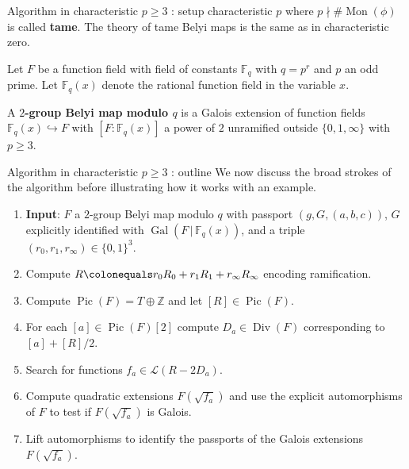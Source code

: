 \documentclass[xcolor=dvipsnames]{beamer}
\theoremstyle{plain}
\newcommand{\ZZ}{\mathbb Z}
\newcommand{\FF}{\mathbb{F}}
\DeclareMathOperator{\Div}{Div}
\DeclareMathOperator{\Pic}{Pic}
\DeclareMathOperator{\Mon}{Mon}
\DeclareMathOperator{\Gal}{Gal}
\begin{document}
{\begin{frame}{Algorithm in characteristic $p\geq 3$ : setup}
      characteristic $p$ where $p\nmid\#\Mon(\phi)$
      is called \textbf{tame}.
      The theory of tame Belyi maps is the same as in
      characteristic zero.
      \pause\par
      Let $F$ be a function field with
      field of constants $\FF_q$
      with $q=p^r$ and $p$ an odd prime.
      Let $\FF_q(x)$ denote the rational function field
      in the variable $x$.
      \pause\par
      A \textbf{$2$-group Belyi map modulo $q$}
      is a Galois extension of function fields
      $\FF_q(x)\hookrightarrow F$
      with $[F:\FF_q(x)]$ a power of $2$
      unramified outside $\{0,1,\infty\}$
      with $p\geq 3$.
    \end{frame}
    \begin{frame}{Algorithm in characteristic $p\geq 3$ : outline}
      We now discuss the broad strokes of the algorithm
      before illustrating how it works with an example.
      \pause
      \begin{enumerate}
        \item
          \textbf{Input}:
          $F$ a $2$-group Belyi map modulo $q$ with
          passport $(g,G,(a,b,c))$,
          $G$ explicitly identified with
          $\Gal(F\,|\,\FF_q(x))$,
          and a triple $(r_0,r_1,r_\infty)\in\{0,1\}^3$.
          \pause
        \item
          Compute $R\colonequals r_0R_0+r_1R_1+r_\infty R_\infty$
          encoding ramification.
          \pause
        \item
          Compute $\Pic(F) = T\oplus\ZZ$
          and let $[R]\in\Pic(F)$.
          \pause
        \item
          For each $[a]\in\Pic(F)[2]$ compute
          $D_a\in\Div(F)$ corresponding to
          $[a]+[R]/2$.
          \pause
        \item
          Search for functions
          $f_a\in\mathscr{L}(R-2D_a)$.
          \pause
        \item
          Compute quadratic extensions
          $F(\sqrt{f_a})$ and use
          the explicit automorphisms of $F$
          to test if $F(\sqrt{f_a})$ is Galois.
          \pause
        \item
          Lift automorphisms to identify
          the passports of the
          Galois extensions $F(\sqrt{f_a})$.
      \end{enumerate}
    \end{frame}
}
\end{document}
